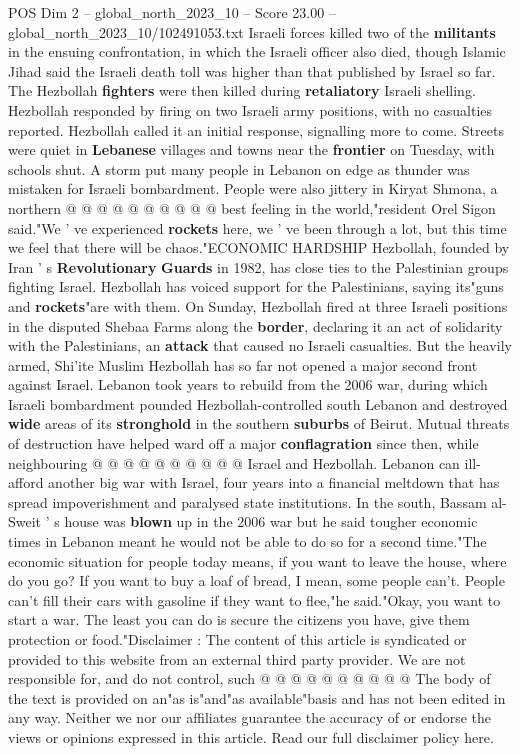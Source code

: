 \begin{textsample}{POS Dim 2 – global\_north\_2023\_10 – Score 23.00 – global\_north\_2023\_10/102491053.txt}
Israeli forces killed two of the \textbf{militants} in the ensuing confrontation, in which the Israeli officer also died, though Islamic Jihad said the Israeli death toll was higher than that published by Israel so far.
The Hezbollah \textbf{fighters} were then killed during \textbf{retaliatory} Israeli shelling.
Hezbollah responded by firing on two Israeli army positions, with no casualties reported.
Hezbollah called it an initial response, signalling more to come.
Streets were quiet in \textbf{Lebanese} villages and towns near the \textbf{frontier} on Tuesday, with schools shut.
A storm put many people in Lebanon on edge as thunder was mistaken for Israeli bombardment.
People were also jittery in Kiryat Shmona, a northern @ @ @ @ @ @ @ @ @ @ best feeling in the world,"resident Orel Sigon said."We ' ve experienced \textbf{rockets} here, we ' ve been through a lot, but this time we feel that there will be chaos."ECONOMIC HARDSHIP Hezbollah, founded by Iran ' s \textbf{Revolutionary} \textbf{Guards} in 1982, has close ties to the Palestinian groups fighting Israel.
Hezbollah has voiced support for the Palestinians, saying its"guns and \textbf{rockets}"are with them.
On Sunday, Hezbollah fired at three Israeli positions in the disputed Shebaa Farms along the \textbf{border}, declaring it an act of solidarity with the Palestinians, an \textbf{attack} that caused no Israeli casualties.
But the heavily armed, Shi'ite Muslim Hezbollah has so far not opened a major second front against Israel.
Lebanon took years to rebuild from the 2006 war, during which Israeli bombardment pounded Hezbollah-controlled south Lebanon and destroyed \textbf{wide} areas of its \textbf{stronghold} in the southern \textbf{suburbs} of Beirut.
Mutual threats of destruction have helped ward off a major \textbf{conflagration} since then, while neighbouring @ @ @ @ @ @ @ @ @ @ Israel and Hezbollah.
Lebanon can ill-afford another big war with Israel, four years into a financial meltdown that has spread impoverishment and paralysed state institutions.
In the south, Bassam al-Sweit ' s house was \textbf{blown} up in the 2006 war but he said tougher economic times in Lebanon meant he would not be able to do so for a second time."The economic situation for people today means, if you want to leave the house, where do you go?
If you want to buy a loaf of bread, I mean, some people can't.
People can't fill their cars with gasoline if they want to flee,"he said."Okay, you want to start a war.
The least you can do is secure the citizens you have, give them protection or food."Disclaimer : The content of this article is syndicated or provided to this website from an external third party provider.
We are not responsible for, and do not control, such @ @ @ @ @ @ @ @ @ @ The body of the text is provided on an"as is"and"as available"basis and has not been edited in any way.
Neither we nor our affiliates guarantee the accuracy of or endorse the views or opinions expressed in this article.
Read our full disclaimer policy here.


\end{textsample}
